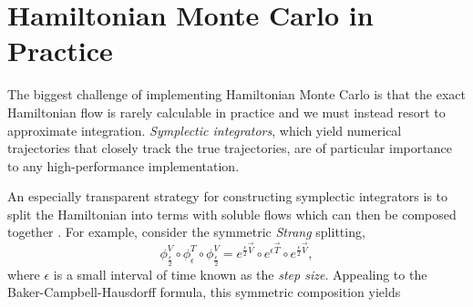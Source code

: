 \documentclass{article}
\begin{document}
\section{Hamiltonian Monte Carlo in Practice}

The biggest challenge of implementing Hamiltonian Monte Carlo is that the
exact Hamiltonian flow is rarely calculable in practice and we must instead resort 
to approximate integration.  \textit{Symplectic integrators}, which yield numerical 
trajectories that closely track the true trajectories, are of particular importance to 
any high-performance implementation. 

An especially transparent strategy for constructing symplectic integrators is to split 
the Hamiltonian into terms with soluble flows which can then be composed together
\cite{LeimkuhlerEtAl:2004, HairerEtAl:2006}.  For example, consider the symmetric 
\textit{Strang} splitting,
%
\begin{equation*}
\phi^{V}_{\frac{\epsilon}{2}} \circ 
\phi^{T}_{\epsilon} \circ 
\phi^{V}_{\frac{\epsilon}{2}}
=
e^{\frac{\epsilon}{2} \vec{V} } \circ 
e^{\epsilon \vec{T} } \circ 
e^{\frac{\epsilon}{2} \vec{V} },
\end{equation*}
%
where $\epsilon$ is a small interval of time known as the \textit{step size}.
Appealing to the Baker-Campbell-Hausdorff formula, this symmetric composition yields
%
\end{document}
